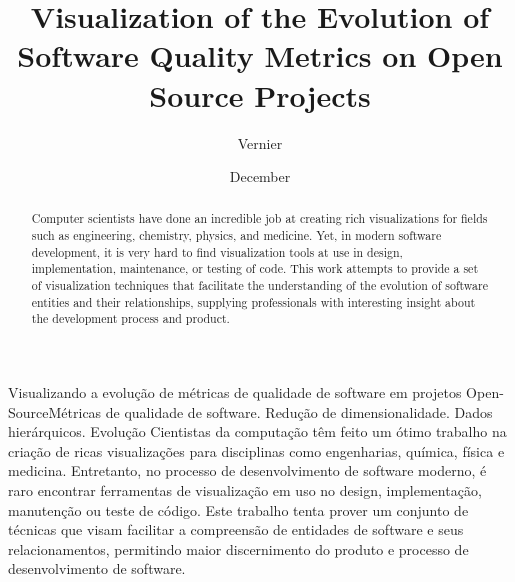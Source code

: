 \documentclass[cic,tc,english]{iiufrgs}
\title{Visualization of the Evolution of Software Quality Metrics on Open Source Projects}
\author{Vernier}{Eduardo Faccin}
\date{December}{2016}
\begin{document}
\maketitle




\begin{abstract}
  Computer scientists have done an incredible job at creating rich visualizations for fields such as engineering, chemistry, physics, and medicine. Yet, in modern software development, it is very hard to find visualization tools at use in design, implementation, maintenance, or testing of code. This work attempts to provide a set of visualization techniques that facilitate the understanding of the evolution of software entities and their relationships, supplying professionals with interesting insight about the development process and product.
\end{abstract}

\begin{englishabstract}{Visualizando a evolução de métricas de qualidade de software em projetos Open-Source}{Métricas de qualidade de software. Redução de dimensionalidade. Dados hierárquicos. Evolução}
Cientistas da computação têm feito um ótimo trabalho na criação de ricas visualizações para disciplinas como engenharias, química, física e medicina. Entretanto, no processo de desenvolvimento de software moderno, é raro encontrar ferramentas de visualização em uso no design, implementação, manutenção ou teste de código. Este trabalho tenta prover um conjunto de técnicas que visam facilitar a compreensão de entidades de software e seus relacionamentos, permitindo maior discernimento do produto e processo de desenvolvimento de software.
\end{englishabstract}
\end{document}
